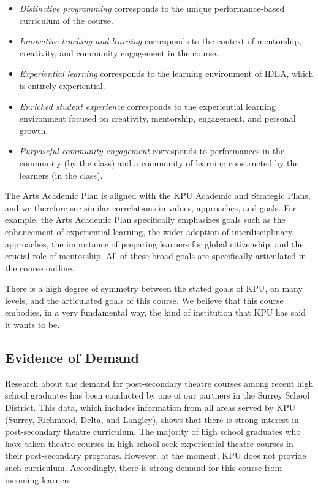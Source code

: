 \documentclass[letterpaper,10pt,headsepline]{scrreprt}
\begin{document}
\begin{itemize}
\item
  \emph{Distinctive programming} corresponds to the unique
  performance-based curriculum of the course.
\item
  \emph{Innovative teaching and learning} corresponds to the context of
  mentorship, creativity, and community engagement in the course.
\item
  \emph{Experiential learning} corresponds to the learning environment
  of IDEA, which is entirely experiential.
\item
  \emph{Enriched student experience} corresponds to the experiential
  learning environment focused on creativity, mentorship, engagement,
  and personal growth.
\item
  \emph{Purposeful community engagement} corresponds to performances in
  the community (by the class) and a community of learning constructed
  by the learners (in the class).
\end{itemize}

The Arts Academic Plan is aligned with the KPU Academic and Strategic
Plans, and we therefore see similar correlations in values, approaches,
and goals. For example, the Arts Academic Plan specifically emphasizes
goals such as the enhancement of experiential learning, the wider
adoption of interdisciplinary approaches, the importance of preparing
learners for global citizenship, and the crucial role of mentorship. All
of these broad goals are specifically articulated in the course outline.

There is a high degree of symmetry between the stated goals of KPU, on
many levels, and the articulated goals of this course. We believe that
this course embodies, in a very fundamental way, the kind of institution
that KPU has said it wants to be.

\subsection{Evidence of Demand}

Research about the demand for post-secondary theatre courses among
recent high school graduates has been conducted by one of our partners
in the Surrey School District. This data, which includes information
from all areas served by KPU (Surrey, Richmond, Delta, and Langley),
shows that there is strong interest in post-secondary theatre
curriculum. The majority of high school graduates who have taken theatre
courses in high school seek experiential theatre courses in their
post-secondary programs. However, at the moment, KPU does not provide
such curriculum. Accordingly, there is strong demand for this course
from incoming learners.
\end{document}
